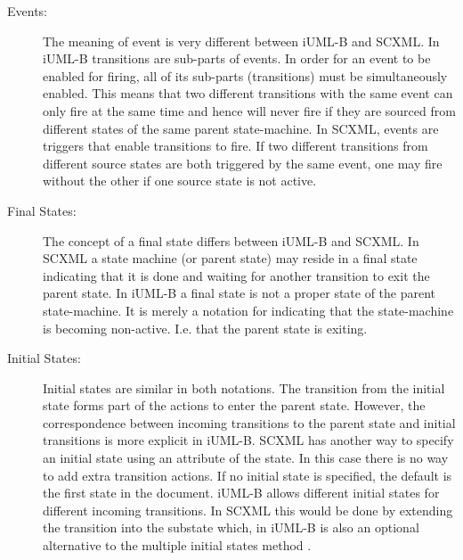 \begin{description}

\item [Events:]
The meaning of event is very different between iUML-B and SCXML.
 In iUML-B transitions are sub-parts of events. 
 In order for an event to be enabled for firing, all of its sub-parts (transitions) must be simultaneously enabled. 
 This means that two different transitions with the same event can only fire at the same time and hence will never fire if they are sourced from different states of the same parent state-machine. 
In SCXML, events are triggers that enable transitions to fire. 
If two different transitions from different source states are both triggered by the same event, one may fire without the other if one source state is not active.

\item [Final States:]
The concept of a final state differs between iUML-B and SCXML. 
In SCXML a state machine (or parent state) may reside in a final state indicating that it is done and waiting for another transition to exit the parent state. 
 In iUML-B a final state is not a proper state of the parent state-machine. 
 It is merely a notation for indicating that the state-machine is becoming non-active. I.e. that the parent state is exiting. 

\item [Initial States:]
Initial states are similar in both notations. 
The transition from the initial state forms part of the actions to enter the parent state. 
However, the correspondence between incoming transitions to the parent state and initial transitions is more explicit in iUML-B. 
SCXML has another way to specify an initial state using an attribute of the state.
 In this case there is no way to add extra transition actions.
If no initial state is specified, the default is the first state in the document.
iUML-B allows different initial states for different incoming transitions. 
In SCXML this would be done by extending the transition into the substate which, in iUML-B is also an optional alternative to the multiple initial states method .


\end{description}
